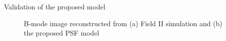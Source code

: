 {\begin{block}{Validation of the proposed model}
\begin{figure}
		\hfill%
		\caption{B-mode image reconstructed from (a) Field II simulation and (b) the proposed PSF model}
	\end{figure}
\end{block}
}%